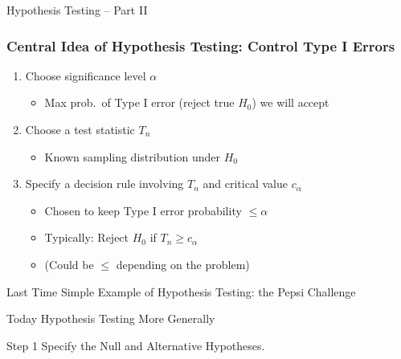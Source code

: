 \documentclass[handout]{beamer}
\date{Lecture 21}
\begin{document}
 





\begin{frame}[plain]
	\titlepage 
	

\end{frame} 



\begin{frame}
\begin{center}
	\huge Hypothesis Testing -- Part II
\end{center}
\end{frame}

\begin{frame}
\frametitle{Central Idea of Hypothesis Testing: Control Type I Errors}
\pause
	\begin{enumerate}
		\item Choose significance level $\alpha$ \pause
			\begin{itemize} 
				\item Max prob.\ of Type I error (reject true $H_0$) we will accept \pause
			\end{itemize}
		\item Choose a test statistic $T_n$ \pause
			\begin{itemize}
				\item Known sampling distribution under $H_0$ \pause
			 \end{itemize} 
		\item Specify a decision rule involving $T_n$ and critical value $c_\alpha$ \pause
			\begin{itemize}
				\item Chosen to keep Type I error probability $\leq \alpha$ \pause
				\item Typically: Reject $H_0$ if $T_n \geq c_\alpha$ \pause
				\item (Could be $\leq$ depending on the problem) 
			\end{itemize}
	\end{enumerate}
\end{frame}


\begin{frame}
\begin{block}{Last Time}
Simple Example of Hypothesis Testing: the Pepsi Challenge
\end{block}

\begin{block}{Today}
Hypothesis Testing More Generally
\end{block}

\end{frame}
\begin{frame}

\begin{alertblock}{Step 1}
Specify the Null and Alternative Hypotheses.
\end{alertblock}

\end{frame}
\end{document}
